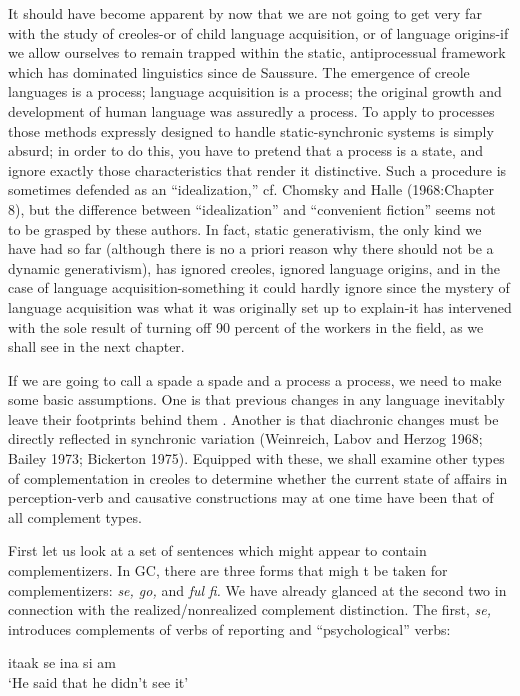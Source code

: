 It should have become apparent by now that we are not going to get very far with the study of creoles-or of child language acquisition, or of language origins-if we allow ourselves to remain trapped within the static, antiprocessual framework which has dominated linguistics since de Saussure. The emergence of creole languages is a process; language acquisition is a process; the original growth and development of human language was assuredly a process. To apply to processes those methods expressly designed to handle static-synchronic systems is simply absurd; in order to do this, you have to pretend that a process
is a state, and ignore exactly those characteristics that render it distinc\-tive. Such a procedure is sometimes defended as an ``idealization,'' cf. Chomsky and Halle (1968:Chapter 8), but the difference between ``idealization'' and ``convenient fiction'' seems not to be grasped by these authors. In fact, static generativism, the only kind we have had so far (although there is no a priori reason why there should not be a dynamic generativism), has ignored creoles, ignored language origins, and in the case of language acquisition-something it could hardly ignore since the mystery of language acquisition was what it was originally set up to explain-it has intervened with the sole result of turning off 90 percent of the workers in the field, as we shall see in the next chapter.

If we are going to call a spade a spade and a process a process, we need to make some basic assumptions. One is that previous changes in any language inevitably leave their footprints behind them \citep{Givan1971}. Another is that diachronic changes must be directly reflected in synchronic variation (Weinreich, Labov and Herzog 1968; Bailey 1973; Bickerton 1975). Equipped with these, we shall examine other types of complementation in creoles to determine whether the current state of affairs in perception-verb and causative constructions may at one time have been that of all complement types.

First let us look at a set of sentences which might appear to contain complementizers. In GC, there are three forms that migh t be taken for complementizers: \textit{se, go,} and \textit{ful} \textit{fi.} We have already glanced at the second two in connection with the realized/nonrealized com\-plement distinction. The first, \textit{se,} introduces complements of verbs of reporting and ``psychological'' verbs:

\ea\label{ex:2:162}
 itaak se ina si am \\
\glt `He said that he didn't see it'
\z



